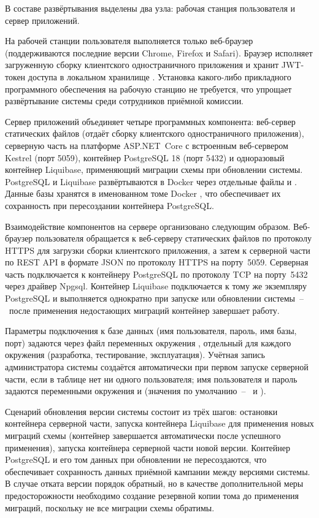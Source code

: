 В составе развёртывания выделены два узла: рабочая станция пользователя и сервер приложений.

На рабочей станции пользователя выполняется только веб-браузер (поддерживаются последние версии Chrome, Firefox и Safari).
Браузер исполняет загруженную сборку клиентского одностраничного приложения и хранит JWT-токен доступа в локальном хранилище .
Установка какого-либо прикладного программного обеспечения на рабочую станцию не требуется, что упрощает развёртывание системы среди сотрудников приёмной комиссии.

Сервер приложений объединяет четыре программных компонента: веб-сервер статических файлов  (отдаёт сборку клиентского одностраничного приложения), серверную часть на платформе ASP.NET~Core с встроенным веб-сервером Kestrel (порт 5059), контейнер PostgreSQL 18 (порт 5432) и одноразовый контейнер Liquibase, применяющий миграции схемы при обновлении системы.
PostgreSQL и Liquibase развёртываются в Docker через отдельные файлы  и .
Данные базы хранятся в именованном томе Docker , что обеспечивает их сохранность при пересоздании контейнера PostgreSQL.

Взаимодействие компонентов на сервере организовано следующим образом.
Веб-браузер пользователя обращается к веб-серверу статических файлов по протоколу HTTPS для загрузки сборки клиентского приложения, а затем к серверной части по REST API в формате JSON по протоколу HTTPS на порту~5059.
Серверная часть подключается к контейнеру PostgreSQL по протоколу TCP на порту~5432 через драйвер Npgsql.
Контейнер Liquibase подключается к тому же экземпляру PostgreSQL и выполняется однократно при запуске или обновлении системы~--~после применения недостающих миграций контейнер завершает работу.

Параметры подключения к базе данных (имя пользователя, пароль, имя базы, порт) задаются через файл переменных окружения , отдельный для каждого окружения (разработка, тестирование, эксплуатация).
Учётная запись администратора системы создаётся автоматически при первом запуске серверной части, если в таблице  нет ни одного пользователя; имя пользователя и пароль задаются переменными окружения  и  (значения по умолчанию~--~ и ).

Сценарий обновления версии системы состоит из трёх шагов: остановки контейнера серверной части, запуска контейнера Liquibase для применения новых миграций схемы (контейнер завершается автоматически после успешного применения), запуска контейнера серверной части новой версии.
Контейнер PostgreSQL и его том данных при обновлении не пересоздаются, что обеспечивает сохранность данных приёмной кампании между версиями системы.
В случае отката версии порядок обратный, но в качестве дополнительной меры предосторожности необходимо создание резервной копии тома  до применения миграций, поскольку не все миграции схемы обратимы.

